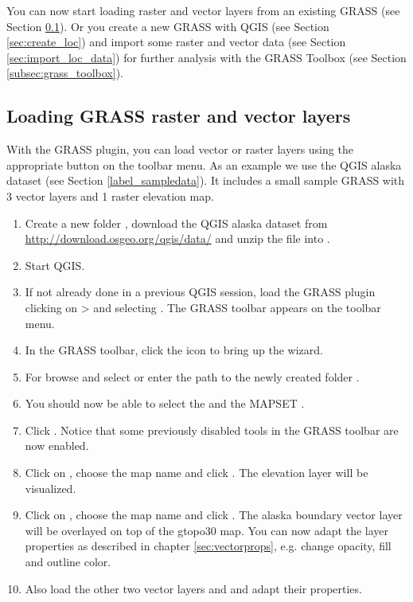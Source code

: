 You can now start loading raster and vector layers from an existing GRASS 
 (see Section \ref{sec:load_grassdata}). Or you create a 
new GRASS  with QGIS (see Section \ref{sec:create_loc}) 
and import some raster and vector data (see Section \ref{sec:import_loc_data}) 
for further analysis with the GRASS Toolbox (see Section 
\ref{subsec:grass_toolbox}).

\subsection{Loading GRASS raster and vector layers}\label{sec:load_grassdata}

With the GRASS plugin, you can load vector or raster layers using the
appropriate button on the toolbar menu. As an example we use the QGIS alaska
dataset (see Section \ref{label_sampledata}). It includes a small sample 
GRASS  with 3 vector layers and 1 raster elevation map.

\begin{enumerate}
  \item Create a new folder , download the QGIS alaska
  dataset  from
  \url{http://download.osgeo.org/qgis/data/} and unzip the file into
  . 
  \item Start QGIS.
  \item If not already done in a previous QGIS session, load the GRASS plugin
  clicking on  >  and
  selecting . The GRASS toolbar appears on the toolbar menu.
  \item In the GRASS toolbar, click the  icon to bring up the  wizard.
  \item For  browse and select or enter the path to the
  newly created folder .
  \item You should now be able to select the 
  and the MAPSET . 
  \item Click . Notice that some previously disabled tools in the 
  GRASS toolbar are now enabled.
  \item Click on ,
  choose the map name  and click . The elevation
  layer will be visualized.
  \item Click on ,
  choose the map name  and click . The alaska
  boundary vector layer will be overlayed on top of the gtopo30 map. You can
  now adapt the layer properties as described in chapter \ref{sec:vectorprops},
  e.g. change opacity, fill and outline color.
  \item Also load the other two vector layers  and
   and adapt their properties.
\end{enumerate}

